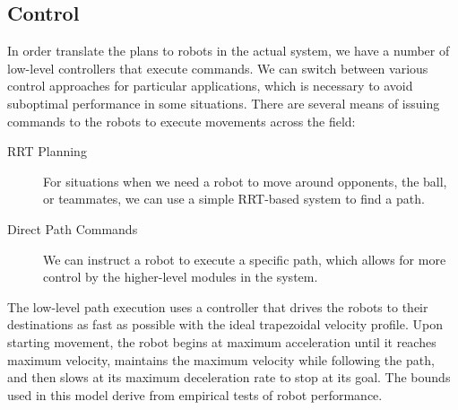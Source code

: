 \subsection{Control}
In order translate the plans to robots in the actual system, we have a number of low-level controllers that execute commands. We can switch between various control approaches for particular applications, which is necessary to avoid suboptimal performance in some situations.  There are several means of issuing commands to the robots to execute movements across the field:
\begin{description}
 \item[RRT Planning] For situations when we need a robot to move around opponents, the ball, or teammates, we can use a simple RRT-based system to find a path.
 \item[Direct Path Commands] We can instruct a robot to execute a specific path, which allows for more control by the higher-level modules in the system.  
 \end{description}

The low-level path execution uses a controller that drives the robots to their destinations as fast as possible with the ideal trapezoidal velocity profile.  Upon starting movement, the robot begins at maximum acceleration until it reaches maximum velocity, maintains the maximum velocity while following the path, and then slows at its maximum deceleration rate to stop at its goal. The bounds used in this model derive from empirical tests of robot performance.  




